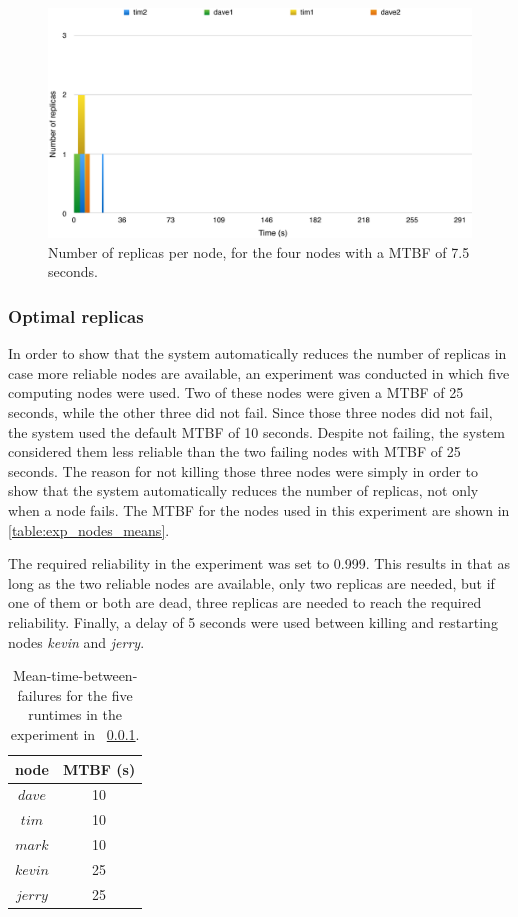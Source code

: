 \documentclass{cslthse-msc}
\begin{document}
\begin{figure}[!hbt]
\centering
\includegraphics[scale=0.5]{images/results/optimal_replicas/MTBF_75.pdf}
\caption{Number of replicas per node, for the four nodes with a MTBF of 7.5 seconds.} \label{fig:exp_opt_replicas_MTBF_75}
\end{figure}

\subsubsection{Optimal replicas}
\label{sec:eval_opt_nbr_replicas_2}
In order to show that the system automatically reduces the number of replicas in case more reliable nodes are available, an experiment was conducted in which five computing nodes were used. Two of these nodes were given a MTBF of 25 seconds, while the other three did not fail. Since those three nodes did not fail, the system used the default MTBF of 10 seconds. Despite not failing, the system considered them less reliable than the two failing nodes with MTBF of 25 seconds. The reason for not killing those three nodes were simply in order to show that the system automatically reduces the number of replicas, not only when a node fails. The MTBF for the nodes used in this experiment are shown in \cref{table:exp_nodes_means}.

The required reliability in the experiment was set to 0.999. This results in that as long as the two reliable nodes are available, only two replicas are needed, but if one of them or both are dead, three replicas are needed to reach the required reliability. Finally, a delay of 5 seconds were used between killing and restarting nodes \emph{kevin} and \emph{jerry}.


\begin{table}[h]
	\begin{center}
	\begin{tabular}{| c  | c |}
	 \hline
	 node & MTBF (s)  \\
	 \hline		
	  $dave$ & 10 \\
	  $tim$ & 10 \\
	  $mark$ & 10 \\
	  $kevin$ & 25 \\
	  $jerry$ & 25 \\
	   \hline
	\end{tabular}
	 \caption{Mean-time-between-failures for the five runtimes in the experiment in ~\cref{sec:eval_opt_nbr_replicas_2}.}
	 \label{table:exp_nodes_means_2}
	 \end{center}
 \end{table}
\end{document}
